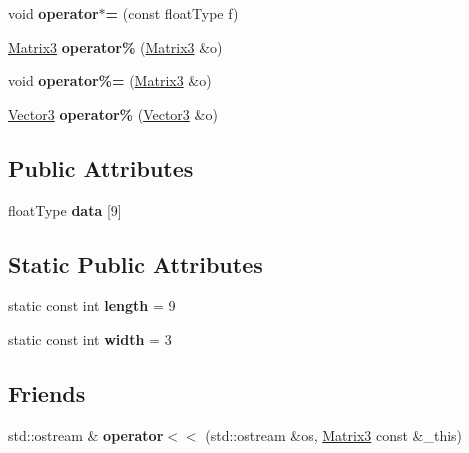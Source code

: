 \begin{DoxyCompactItemize}
\item 
\hypertarget{classMatrix3_af6636ba3bb55cb4b3330ba9aa12eeccf}{void {\bfseries operator$\ast$=} (const float\-Type f)}\label{classMatrix3_af6636ba3bb55cb4b3330ba9aa12eeccf}

\item 
\hypertarget{classMatrix3_a277b3d1a29379e20f388e9e0c83f66a6}{\hyperlink{classMatrix3}{Matrix3} {\bfseries operator\%} (\hyperlink{classMatrix3}{Matrix3} \&o)}\label{classMatrix3_a277b3d1a29379e20f388e9e0c83f66a6}

\item 
\hypertarget{classMatrix3_a9f28b8dffc8678911a29dece40df2799}{void {\bfseries operator\%=} (\hyperlink{classMatrix3}{Matrix3} \&o)}\label{classMatrix3_a9f28b8dffc8678911a29dece40df2799}

\item 
\hypertarget{classMatrix3_a115e7c7184279f29f767eba6a8b6c7fb}{\hyperlink{classVector3}{Vector3} {\bfseries operator\%} (\hyperlink{classVector3}{Vector3} \&o)}\label{classMatrix3_a115e7c7184279f29f767eba6a8b6c7fb}

\end{DoxyCompactItemize}
\subsection*{Public Attributes}
\begin{DoxyCompactItemize}
\item 
\hypertarget{classMatrix3_aef0aaf953f03d684b081ef20d05007ec}{float\-Type {\bfseries data} \mbox{[}9\mbox{]}}\label{classMatrix3_aef0aaf953f03d684b081ef20d05007ec}

\end{DoxyCompactItemize}
\subsection*{Static Public Attributes}
\begin{DoxyCompactItemize}
\item 
\hypertarget{classMatrix3_ae589d06eedb71c5c7f6fdf26575a0601}{static const int {\bfseries length} = 9}\label{classMatrix3_ae589d06eedb71c5c7f6fdf26575a0601}

\item 
\hypertarget{classMatrix3_a3c4c222f04f35d48387e3ac25da183f3}{static const int {\bfseries width} = 3}\label{classMatrix3_a3c4c222f04f35d48387e3ac25da183f3}

\end{DoxyCompactItemize}
\subsection*{Friends}
\begin{DoxyCompactItemize}
\item 
\hypertarget{classMatrix3_a7ff75dc8db7e75bb4debb7928deb58fc}{std\-::ostream \& {\bfseries operator$<$$<$} (std\-::ostream \&os, \hyperlink{classMatrix3}{Matrix3} const \&\-\_\-this)}\label{classMatrix3_a7ff75dc8db7e75bb4debb7928deb58fc}

\end{DoxyCompactItemize}


